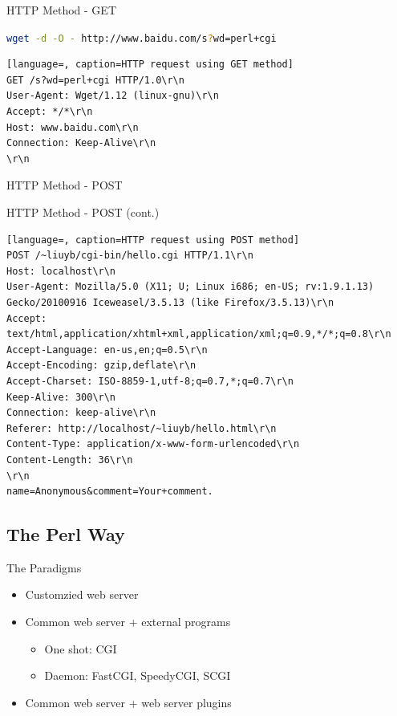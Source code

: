 \documentclass{beamer}
\begin{document}
\begin{frame}[containsverbatim]{HTTP Method - GET}
  \begin{center}
    \lstinline[language=bash]{wget -d -O - http://www.baidu.com/s?wd=perl+cgi}
  \end{center}
  \begin{lstlisting}[language=, caption=HTTP request using GET method]
GET /s?wd=perl+cgi HTTP/1.0\r\n
User-Agent: Wget/1.12 (linux-gnu)\r\n
Accept: */*\r\n
Host: www.baidu.com\r\n
Connection: Keep-Alive\r\n
\r\n
  \end{lstlisting}
\end{frame}

\begin{frame}[containsverbatim]{HTTP Method - POST}
 
\end{frame}

\begin{frame}[containsverbatim]{HTTP Method - POST (cont.)}
  \begin{lstlisting}[language=, caption=HTTP request using POST method]
POST /~liuyb/cgi-bin/hello.cgi HTTP/1.1\r\n
Host: localhost\r\n
User-Agent: Mozilla/5.0 (X11; U; Linux i686; en-US; rv:1.9.1.13) Gecko/20100916 Iceweasel/3.5.13 (like Firefox/3.5.13)\r\n
Accept: text/html,application/xhtml+xml,application/xml;q=0.9,*/*;q=0.8\r\n
Accept-Language: en-us,en;q=0.5\r\n
Accept-Encoding: gzip,deflate\r\n
Accept-Charset: ISO-8859-1,utf-8;q=0.7,*;q=0.7\r\n
Keep-Alive: 300\r\n
Connection: keep-alive\r\n
Referer: http://localhost/~liuyb/hello.html\r\n
Content-Type: application/x-www-form-urlencoded\r\n
Content-Length: 36\r\n
\r\n
name=Anonymous&comment=Your+comment.
  \end{lstlisting}
\end{frame}

\subsection{The Perl Way}

\begin{frame}{The Paradigms}
  \begin{itemize}
    \item Customzied web server
    \item Common web server + external programs
        \begin{itemize}
            \item One shot: CGI
            \item Daemon: FastCGI, SpeedyCGI, SCGI
        \end{itemize}
    \item Common web server + web server plugins
  \end{itemize}
\end{frame}
\end{document}
